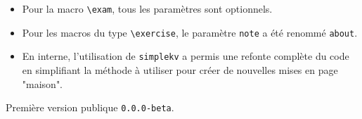 \documentclass[12pt,a4paper]{scrartcl}
\theoremstyle{definition}
\begin{document}
\begin{description}[leftmargin=1em]
\begin{itemize}
        \item Pour la macro \verb+\exam+, tous les paramètres sont optionnels.

        \item Pour les macros du type \verb+\exercise+, le paramètre \verb+note+ a été renommé \verb+about+.

        \item En interne, l'utilisation de \verb+simplekv+ a permis une refonte complète du code en simplifiant la méthode à utiliser pour créer de nouvelles mises en page "maison".
    \end{itemize}


    \item[2017-11-03] Première version publique \verb+0.0.0-beta+.
\end{description}
\end{document}
